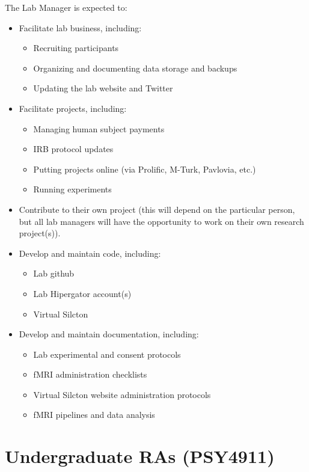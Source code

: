 \documentclass[
  12pt,
]{book}
\begin{document}
The Lab Manager is expected to:

\begin{itemize}
\item
  Facilitate lab business, including:

  \begin{itemize}
  \item
    Recruiting participants
  \item
    Organizing and documenting data storage and backups
  \item
    Updating the lab website and Twitter
  \end{itemize}
\item
  Facilitate projects, including:

  \begin{itemize}
  \item
    Managing human subject payments
  \item
    IRB protocol updates
  \item
    Putting projects online (via Prolific, M-Turk, Pavlovia, etc.)
  \item
    Running experiments
  \end{itemize}
\item
  Contribute to their own project (this will depend on the particular person, but all lab managers will have the opportunity to work on their own research project(s)).
\item
  Develop and maintain code, including:

  \begin{itemize}
  \item
    Lab github
  \item
    Lab Hipergator account(s)
  \item
    Virtual Silcton
  \end{itemize}
\item
  Develop and maintain documentation, including:

  \begin{itemize}
  \item
    Lab experimental and consent protocols
  \item
    fMRI administration checklists
  \item
    Virtual Silcton website administration protocols
  \item
    fMRI pipelines and data analysis
  \end{itemize}
\end{itemize}

\hypertarget{undergraduate-ras-psy4911}{%
\section{Undergraduate RAs (PSY4911)}\label{undergraduate-ras-psy4911}}
\end{document}
